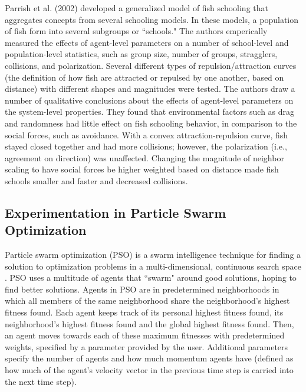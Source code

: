 Parrish et al. (2002)\nocite{parrish2002sof} developed a generalized model of fish schooling that aggregates concepts from several schooling models.
In these models, a population of fish form into several subgroups or ``schools."
The authors emperically measured the effects of agent-level parameters on a number of school-level and population-level statistics, such as group size, number of groups, stragglers, collisions, and polarization.
Several different types of repulsion/attraction curves (the definition of how fish are attracted or repulsed by one another, based on distance) with different shapes and magnitudes were tested.
The authors draw a number of qualitative conclusions about the effects of agent-level parameters on the system-level properties.
They found that environmental factors such as drag and randomness had little effect on fish schooling behavior, in comparison to the social forces, such as avoidance.
With a convex attraction-repulsion curve, fish stayed closed together and had more collisions; however, the polarization (i.e., agreement on direction) was unaffected.
Changing the magnitude of neighbor scaling to have social forces be higher weighted based on distance made fish schools smaller and faster and decreased collisions.


\subsection{Experimentation in Particle Swarm Optimization}

Particle swarm optimization (PSO) is a swarm intelligence technique for finding a solution to optimization problems in a multi-dimensional, continuous search space \cite{kennedy1995pso}.
PSO uses a multitude of agents that ``swarm" around good solutions, hoping to find better solutions.
Agents in PSO are in predetermined neighborhoods in which all members of the same neighborhood share the neighborhood's highest fitness found.
Each agent keeps track of its personal highest fitness found, its neighborhood's highest fitness found and the global highest fitness found.
Then, an agent moves towards each of these maximum fitnesses with predetermined weights, specified by a parameter provided by the user.
Additional parameters specify the number of agents and how much momentum agents have (defined as how much of the agent's velocity vector in the previous time step is carried into the next time step).

